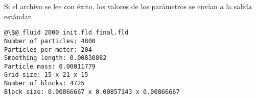 Si el archivo se lee con éxito, los valores de los parámetros se envían a la
salida estándar.

\begin{lstlisting}[style=terminal,escapechar=@]
@\$@ fluid 2000 init.fld final.fld
Number of particles: 4800
Particles per meter: 204
Smoothing length: 0.00830882
Particle mass: 0.00011779
Grid size: 15 x 21 x 15
Number of blocks: 4725
Block size: 0.00866667 x 0.00857143 x 0.00866667
\end{lstlisting}

